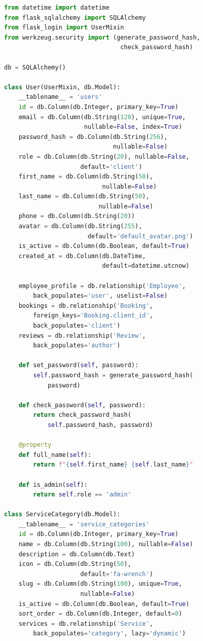 \documentclass[14pt,a4paper,oneside]{extarticle}
\begin{document}
\begin{lstlisting}[language=Python, caption={Полный код моделей базы данных (app/models.py)}, label={lst:full_models}]
from datetime import datetime
from flask_sqlalchemy import SQLAlchemy
from flask_login import UserMixin
from werkzeug.security import (generate_password_hash,
                                check_password_hash)

db = SQLAlchemy()

class User(UserMixin, db.Model):
    __tablename__ = 'users'
    id = db.Column(db.Integer, primary_key=True)
    email = db.Column(db.String(120), unique=True,
                      nullable=False, index=True)
    password_hash = db.Column(db.String(256),
                              nullable=False)
    role = db.Column(db.String(20), nullable=False,
                     default='client')
    first_name = db.Column(db.String(50),
                           nullable=False)
    last_name = db.Column(db.String(50),
                          nullable=False)
    phone = db.Column(db.String(20))
    avatar = db.Column(db.String(255),
                       default='default_avatar.png')
    is_active = db.Column(db.Boolean, default=True)
    created_at = db.Column(db.DateTime,
                           default=datetime.utcnow)

    employee_profile = db.relationship('Employee',
        back_populates='user', uselist=False)
    bookings = db.relationship('Booking',
        foreign_keys='Booking.client_id',
        back_populates='client')
    reviews = db.relationship('Review',
        back_populates='author')

    def set_password(self, password):
        self.password_hash = generate_password_hash(
            password)

    def check_password(self, password):
        return check_password_hash(
            self.password_hash, password)

    @property
    def full_name(self):
        return f"{self.first_name} {self.last_name}"

    def is_admin(self):
        return self.role == 'admin'

class ServiceCategory(db.Model):
    __tablename__ = 'service_categories'
    id = db.Column(db.Integer, primary_key=True)
    name = db.Column(db.String(100), nullable=False)
    description = db.Column(db.Text)
    icon = db.Column(db.String(50),
                     default='fa-wrench')
    slug = db.Column(db.String(100), unique=True,
                     nullable=False)
    is_active = db.Column(db.Boolean, default=True)
    sort_order = db.Column(db.Integer, default=0)
    services = db.relationship('Service',
        back_populates='category', lazy='dynamic')


\end{lstlisting}
\end{document}
